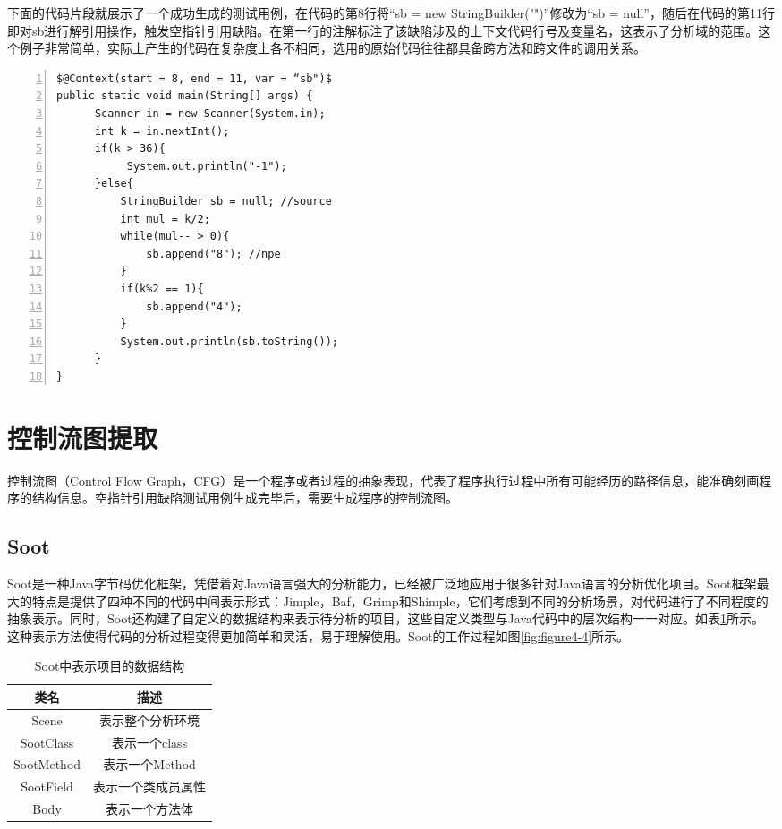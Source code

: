 下面的代码片段就展示了一个成功生成的测试用例，在代码的第8行将“sb = new StringBuilder("")”修改为“sb = null”，随后在代码的第11行即对sb进行解引用操作，触发空指针引用缺陷。在第一行的注解标注了该缺陷涉及的上下文代码行号及变量名，这表示了分析域的范围。这个例子非常简单，实际上产生的代码在复杂度上各不相同，选用的原始代码往往都具备跨方法和跨文件的调用关系。 

\begin{lstlisting}[language={[AspectJ]Java},numbers=left,keywordstyle=\color{blue!70},commentstyle=\color{red!50!green!50!blue!50},frame=shadowbox, rulesepcolor=\color{red!20!green!20!blue!20}] 
$@Context(start = 8, end = 11, var = “sb")$
public static void main(String[] args) {
      Scanner in = new Scanner(System.in); 
      int k = in.nextInt();
      if(k > 36){
           System.out.println("-1");
      }else{
          StringBuilder sb = null; //source                 
          int mul = k/2;
          while(mul-- > 0){
              sb.append("8"); //npe
          }
          if(k%2 == 1){
              sb.append("4");
          }
          System.out.println(sb.toString());
      }
}
\end{lstlisting}

\section{控制流图提取}
控制流图（Control Flow Graph，CFG）是一个程序或者过程的抽象表现，代表了程序执行过程中所有可能经历的路径信息，能准确刻画程序的结构信息。空指针引用缺陷测试用例生成完毕后，需要生成程序的控制流图。
\subsection{Soot}
Soot\cite{vallee2010soot}是一种Java字节码优化框架，凭借着对Java语言强大的分析能力，已经被广泛地应用于很多针对Java语言的分析优化项目。Soot框架最大的特点是提供了四种不同的代码中间表示形式：Jimple，Baf，Grimp和Shimple，它们考虑到不同的分析场景，对代码进行了不同程度的抽象表示。同时，Soot还构建了自定义的数据结构来表示待分析的项目，这些自定义类型与Java代码中的层次结构一一对应。如表\ref{tab:table4-2}所示。这种表示方法使得代码的分析过程变得更加简单和灵活，易于理解使用。Soot的工作过程如图\ref{fig:figure4-4}所示。

\begin{table}[hb]
	\centering
	\caption{Soot中表示项目的数据结构} \label{tab:table4-2}
	\begin{tabular*}{0.9\textwidth}{@{\extracolsep{\fill}}cc}
		\toprule
		类名	&描述	 \\
		\midrule
		Scene	&表示整个分析环境\\
		SootClass	&表示一个class	\\
		SootMethod	&表示一个Method	 \\
		SootField	&表示一个类成员属性	\\
		Body	&表示一个方法体 \\
		\bottomrule
	\end{tabular*}
\end{table}

